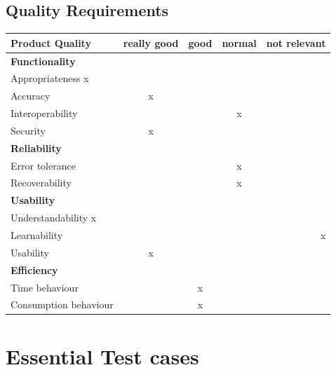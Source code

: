\documentclass[twoside, english, draft]{Pflichtenheft}
\begin{document}
\subsection{Quality Requirements}

\begin{tabular}{l*{3}{c}r}
Product Quality              & really good & good & normal & not relevant  \\
\hline
\textbf{Functionality} &  &  &  &    \\
Appropriateness x & & & & \\
Accuracy  & x & & & \\
Interoperability & & & x & \\
Security & x & & & \\
\textbf{Reliability} &  &  &  &    \\
Error tolerance & & & x & \\
Recoverability & & & x & \\
\textbf{Usability} &  &  &  &    \\
Understandability x & & & & \\
Learnability & & & & x \\
Usability & x & & & \\

\textbf{Efficiency} &  &  &  &    \\
Time behaviour & & x & & \\
Consumption behaviour & & x & & \\
\end{tabular}

\section{Essential Test cases}
\end{document}
